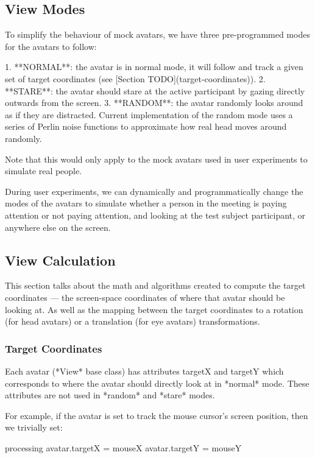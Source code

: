 \subsection{View Modes}

To simplify the behaviour of mock avatars, we have three pre-programmed modes for the avatars to follow:

1. **NORMAL**: the avatar is in normal mode, it will follow and track a given set of target coordinates (see [Section TODO](target-coordinates)).
2. **STARE**: the avatar should stare at the active participant by gazing directly outwards from the screen.
3. **RANDOM**: the avatar randomly looks around as if they are distracted. Current implementation of the random mode uses a series of Perlin noise functions to approximate how real head moves around randomly.

Note that this would only apply to the mock avatars used in user experiments to simulate real people.

During user experiments, we can dynamically and programmatically change the modes of the avatars to simulate whether a person in the meeting is paying attention or not paying attention, and looking at the test subject participant, or anywhere else on the screen.


\subsection{View Calculation}

This section talks about the math and algorithms created to compute the target coordinates --- the screen-space coordinates of where that avatar should be looking at. As well as the mapping between the target coordinates to a rotation (for head avatars) or a translation (for eye avatars) transformations.

\subsubsection{Target Coordinates}

Each avatar (*View* base class) has attributes targetX and targetY which corresponds to where the avatar should directly look at in *normal* mode. These attributes are not used in *random* and *stare* modes.

For example, if the avatar is set to track the mouse cursor’s screen position, then we trivially set:

processing
avatar.targetX = mouseX
avatar.targetY = mouseY


